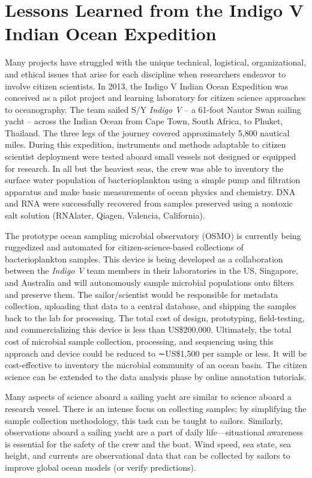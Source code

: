 \section{Lessons Learned from the Indigo V Indian Ocean Expedition}

Many projects have struggled with the unique technical, logistical, organizational, and ethical issues that arise for each discipline when researchers endeavor to involve citizen scientists. In 2013, the Indigo V Indian Ocean Expedition was conceived as a pilot project and learning laboratory for citizen science approaches to oceanography. The team sailed S/Y {\em Indigo V} -- a 61-foot Nautor Swan sailing yacht -- across the Indian Ocean from Cape Town, South Africa, to Phuket, Thailand. The three legs of the journey covered approximately 5,800 nautical miles. During this expedition, instruments and methods adaptable to citizen scientist deployment were tested aboard small vessels not designed or equipped for research. In all but the heaviest seas, the crew was able to inventory the surface water population of bacterioplankton using a simple pump and filtration apparatus and make basic measurements of ocean physics and chemistry. DNA and RNA were successfully recovered from samples preserved using a nontoxic salt solution (RNAlater, Qiagen, Valencia, California).

The prototype ocean sampling microbial observatory (OSMO) is currently being ruggedized and automated for citizen-science-based collections of bacterioplankton samples. This device is being developed as a collaboration between the {\em Indigo V} team members in their laboratories in the US, Singapore, and Australia and will autonomously sample microbial populations onto filters and preserve them. The sailor/scientist would be responsible for metadata collection, uploading that data to a central database, and shipping the samples back to the lab for processing. The total cost of design, prototyping, field-testing, and commercializing this device is less than US\$200,000. Ultimately, the total cost of microbial sample collection, processing, and sequencing using this approach and device could be reduced to ∼US\$1,500 per sample or less. It will be cost-effective to inventory the microbial community of an ocean basin. The citizen science can be extended to the data analysis phase by online annotation tutorials.

Many aspects of science aboard a sailing yacht are similar to science aboard a research vessel. There is an intense focus on collecting samples; by simplifying the sample collection methodology, this task can be taught to sailors. Similarly, observations aboard a sailing yacht are a part of daily life—situational awareness is essential for the safety of the crew and the boat. Wind speed, sea state, sea height, and currents are observational data that can be collected by sailors to improve global ocean models (or verify predictions).

